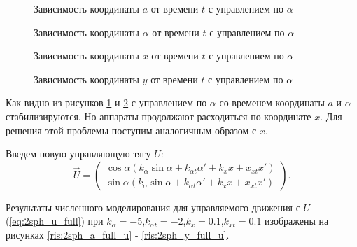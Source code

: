 \begin{figure}[H]
	\caption{Зависимость координаты $a$ от времени $t$ с управлением по $\alpha$}
	\label{ris:2sph_a_alpha_u}
\end{figure}
\begin{figure}[H]
	\caption{Зависимость координаты $\alpha$ от времени $t$ с управлением по $\alpha$}
	\label{ris:2sph_alpha_alpha_u}
\end{figure} 
\begin{figure}[H]
	\caption{Зависимость координаты $x$ от времени $t$ с управлением по $\alpha$}
	\label{ris:2sph_x_alpha_u}
\end{figure} 
\begin{figure}[H]
	\caption{Зависимость координаты $y$ от времени $t$ с управлением по $\alpha$}
	\label{ris:2sph_y_alpha_u}
\end{figure} 

Как видно из рисунков \ref{ris:2sph_a_alpha_u} и \ref{ris:2sph_alpha_alpha_u} с управлением по $\alpha$ со временем координаты $a$ и $\alpha$ стабилизируются.
Но аппараты продолжают расходиться по координате $x$.
Для решения этой проблемы поступим аналогичным образом с $x$.

Введем новую управляющую тягу $U$:
\begin{equation}
\label{eq:2sph_u_full}
	\vec{U} = 
	\begin{pmatrix}
		\cos \alpha \left(k_\alpha \sin \alpha + k_{\alpha t}\alpha' + k_x x + x_{xt} x'\right)\\
		\sin \alpha \left(k_\alpha \sin \alpha + k_{\alpha t}\alpha' + k_x x + x_{xt} x'\right)
	\end{pmatrix}.
\end{equation}

Результаты численного моделирования для управляемого движения с $U$ (\ref{eq:2sph_u_full}) при $k_\alpha = -5$,$k_{\alpha t} = -2$,$k_x = 0.1$,$k_{x t} = 0.1$ изображены на рисунках \ref{ris:2sph_a_full_u} - \ref{ris:2sph_y_full_u}.

